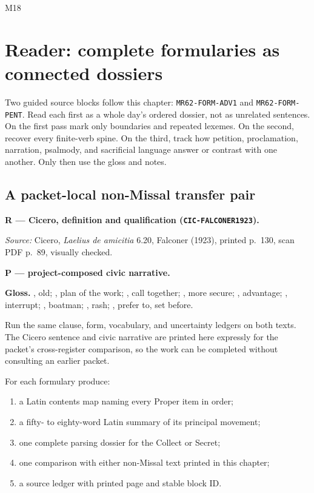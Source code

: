 \begin{courseunit}{M18}
\chapter{Reader: complete formularies as connected dossiers}

Two guided source blocks follow this chapter: \texttt{MR62-FORM-ADV1} and
\texttt{MR62-FORM-PENT}.  Read each first as a whole day's ordered dossier, not
as unrelated sentences.  On the first pass mark only boundaries and repeated
lexemes.  On the second, recover every finite-verb spine.  On the third, track
how petition, proclamation, narration, psalmody, and sacrificial language
answer or contrast with one another.  Only then use the gloss and notes.

\section{A packet-local non-Missal transfer pair}

\textbf{R --- Cicero, definition and qualification
(\texttt{CIC-FALCONER1923}).}

\ReaderCiceroFriendship

\emph{Source:} Cicero, \textit{Laelius de amicitia} 6.20, Falconer (1923),
printed p.~130, scan PDF p.~89, visually checked.

\textbf{P --- project-composed civic narrative.}

\ReaderBridgeNarrative

\textbf{Gloss.} , old; , plan of the work;
, call together; , more secure;
, advantage; , interrupt;
, boatman; , rash;
, prefer to, set before.

Run the same clause, form, vocabulary, and uncertainty ledgers on both texts.
The Cicero sentence and civic narrative are printed here expressly for the
packet's cross-register comparison, so the work can be completed without
consulting an earlier packet.

For each formulary produce:

\begin{enumerate}
\item a Latin contents map naming every Proper item in order;
\item a fifty- to eighty-word Latin summary of its principal movement;
\item one complete parsing dossier for the Collect or Secret;
\item one comparison with either non-Missal text printed in this chapter;
\item a source ledger with printed page and stable block ID.
\end{enumerate}


\end{courseunit}
